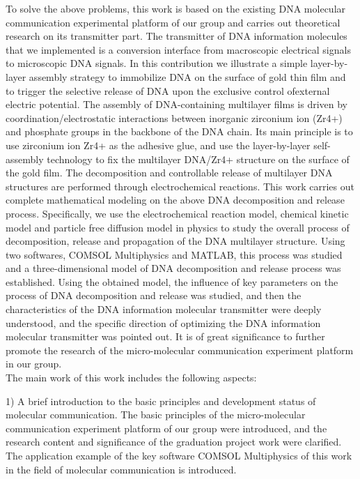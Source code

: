 \begin{digest}
  To solve the above problems, this work is based on the existing DNA molecular communication experimental platform of our group and carries out theoretical research on its transmitter part. The transmitter of DNA information molecules that we implemented is a conversion interface from macroscopic electrical signals to microscopic DNA signals. In this contribution we illustrate a simple layer-by-layer assembly strategy to immobilize DNA on the surface of gold thin film and to trigger the selective release of DNA upon the exclusive control ofexternal electric potential. The assembly of DNA-containing multilayer films is driven by coordination/electrostatic interactions between inorganic zirconium ion (Zr4+) and phosphate groups in the backbone of the DNA chain. Its main principle is to use zirconium ion Zr4+ as the adhesive glue, and use the layer-by-layer self-assembly technology to fix the multilayer DNA/Zr4+ structure on the surface of the gold film. The decomposition and controllable release of multilayer DNA structures are performed through electrochemical reactions. This work carries out complete mathematical modeling on the above DNA decomposition and release process. Specifically, we use the electrochemical reaction model, chemical kinetic model and particle free diffusion model in physics to study the overall process of decomposition, release and propagation of the DNA multilayer structure. Using two softwares, COMSOL Multiphysics and MATLAB, this process was studied and a three-dimensional model of DNA decomposition and release process was established. Using the obtained model, the influence of key parameters on the process of DNA decomposition and release was studied, and then the characteristics of the DNA information molecular transmitter were deeply understood, and the specific direction of optimizing the DNA information molecular transmitter was pointed out. It is of great significance to further promote the research of the micro-molecular communication experiment platform in our group.\\
  
  The main work of this work includes the following aspects:
  
  1) A brief introduction to the basic principles and development status of molecular communication. The basic principles of the micro-molecular communication experiment platform of our group were introduced, and the research content and significance of the graduation project work were clarified. The application example of the key software COMSOL Multiphysics of this work in the field of molecular communication is introduced.


\end{digest}
